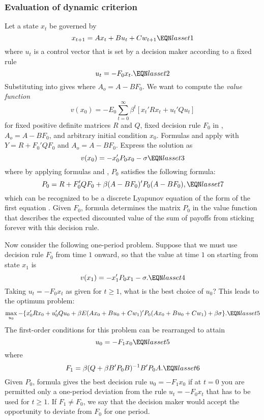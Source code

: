 \subsubsection{Evaluation of dynamic criterion}\label{sec:Howard1}%
 Let a state $x_t$ be governed by
$$ x_{t+1} = A x_t + B u_t + C w_{t+1} \EQN lasset1  $$
where $u_t$ is a control vector that is set by a decision maker according to
a fixed rule
$$ u_t = - F_0 x_t .\EQN lasset2 $$
Substituting  into  gives 
where
$A_o = A - BF_0$.
We want to compute the  {\it value function\/}
%
$$  v(x_0) = - E_0 \sum_{t=0}^\infty \beta^t [x_t' R x_t + u_t' Q u_t] $$
for fixed positive definite matrices $R$ and $Q$,  fixed decision rule $F_0$ in ,
$A_o=A-BF_0$, and arbitrary initial condition $x_0$.
Formulas   and  apply with
$Y = R + F_0' Q F_0$ and $A_o=A-BF_0$.
Express the solution as
$$ v(x_0) = - x_0' P_0 x_0 - \sigma  \EQN lasset3 $$
where by applying formulas 
and , $P_0$ satisfies  the following formula:
$$ P_0 = R + F_0'QF_0 + \beta (A -BF_0)' P_0 (A-BF_0), \EQN lasset7 $$
which can be recognized to be a discrete Lyapunov equation of the form
of the first equation .
Given $F_0$, formula  determines the matrix $P_0$ in the
value function that describes the expected discounted value of the sum
of payoffs from
sticking forever with this decision rule.


Now consider the following one-period problem.  Suppose that
we must use decision rule $F_0$ from time $1$ onward,  so that
the value at time $1$ on starting from state $x_1$ is
$$ v(x_1) = - x_1' P_0 x_1 - \sigma. \EQN lasset4 $$
Taking $u_t= - F_0 x_t$ as given for $t \geq 1$,
what is the best choice of $u_0$?  This   leads
to the optimum problem:
$$ \max_{u_0} - \{x_0' R x_0 + u_0' Q u_0
  + \beta E(A x_0 + B u_0 + C w_1)' P_0 (A x_0 + B u_0 + C w_1)
  + \beta \sigma\}. \EQN lasset5 $$
The first-order conditions for this problem can be rearranged to attain
$$ u_0 = - F_1 x_0 \EQN lasset5 $$
where $$ F_1 = \beta(Q + \beta B' P_0 B)^{-1} B' P_0 A.
 \EQN lasset6 $$
 Given $P_0$, formula
 gives the best decision rule $u_0 = - F_1
x_0$ if at $t=0$ you are permitted only a one-period deviation from the
rule $u_t = - F_0 x_t$ that has to be used  for $t \geq 1$.   If $F_1 \neq F_0$, we say that the decision
maker would accept the opportunity to deviate from $F_0$ for one period.

